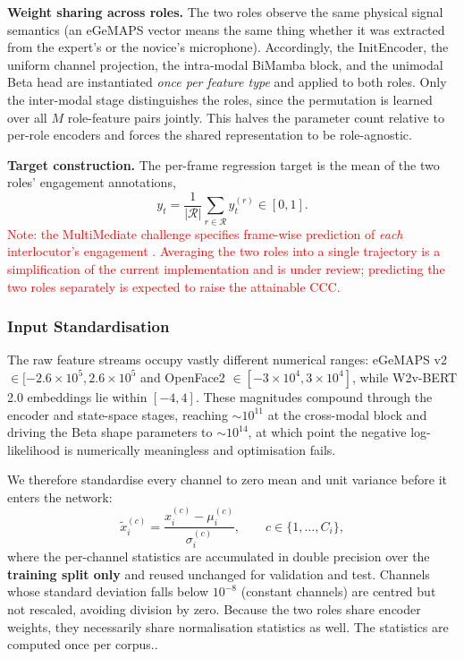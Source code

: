 \documentclass[11pt,a4paper]{article}
\begin{document}
	\textbf{Weight sharing across roles.} The two roles observe the same physical signal semantics (an eGeMAPS vector means the same thing whether it was extracted from the expert's or the novice's microphone). Accordingly, the InitEncoder, the uniform channel projection, the intra-modal BiMamba block, and the unimodal Beta head are instantiated \emph{once per feature type} and applied to both roles. Only the inter-modal stage distinguishes the roles, since the permutation is learned over all $M$ role-feature pairs jointly. This halves the parameter count relative to per-role encoders and forces the shared representation to be role-agnostic.
	
	\textbf{Target construction.} The per-frame regression target is the mean of the two roles' engagement annotations,
	$$y_t = \frac{1}{|\mathcal{R}|}\sum_{r\in\mathcal{R}} y_t^{(r)} \in [0,1].$$
	\textcolor{red}{Note: the MultiMediate challenge specifies frame-wise prediction of \emph{each} interlocutor's engagement \cite{withanage25}. Averaging the two roles into a single trajectory is a simplification of the current implementation and is under review; predicting the two roles separately is expected to raise the attainable CCC.}
	
	\subsubsection{Input Standardisation}
	The raw feature streams occupy vastly different numerical ranges: eGeMAPS v2 $\in [-2.6 \times 10^5, 2.6 \times 10^5$ and OpenFace2 $\in [-3 \times10^4, 3 \times 10^4]$, while W2v-BERT 2.0 embeddings lie within $[-4, 4]$. These magnitudes compound through the encoder and state-space stages, reaching $\sim 10^{11}$ at the cross-modal block and driving the Beta shape parameters to $\sim 10^{14}$, at which point the negative log-likelihood is numerically meaningless and optimisation fails.
	
	We therefore standardise every channel to zero mean and unit variance before it enters the network:
	$$\tilde{x}_{i}^{(c)} = \frac{x_{i}^{(c)} - \mu_{i}^{(c)}}{\sigma_{i}^{(c)}}, \qquad c \in \{1,\dots,C_i\},$$
	where the per-channel statistics are accumulated in double precision over the \textbf{training split only} and reused unchanged for validation and test. Channels whose standard deviation falls below $10^{-8}$ (constant channels) are centred but not rescaled, avoiding division by zero. Because the two roles share encoder weights, they necessarily share normalisation statistics as well. The statistics are computed once per corpus..
	
\end{document}

